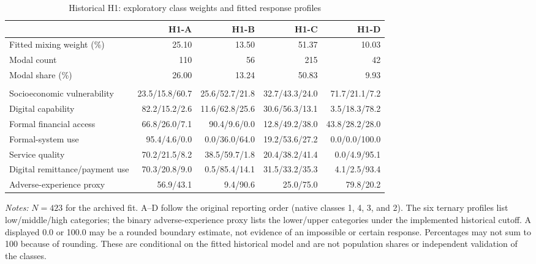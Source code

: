 \begin{table}[!htbp]
\centering
\caption{Historical H1: exploratory class weights and fitted response profiles}
\label{tab:historical-h1-profiles}
\small
\begin{tabular}{@{}lrrrr@{}}
\toprule
 & H1-A & H1-B & H1-C & H1-D \\
\midrule
Fitted mixing weight (\%) & 25.10 & 13.50 & 51.37 & 10.03 \\
Modal count & 110 & 56 & 215 & 42 \\
Modal share (\%) & 26.00 & 13.24 & 50.83 & 9.93 \\
\addlinespace
\multicolumn{5}{@{}l}{\textit{Fitted response probabilities (percent, by historical category)}} \\
Socioeconomic vulnerability & 23.5/15.8/60.7 & 25.6/52.7/21.8 & 32.7/43.3/24.0 & 71.7/21.1/7.2 \\
Digital capability & 82.2/15.2/2.6 & 11.6/62.8/25.6 & 30.6/56.3/13.1 & 3.5/18.3/78.2 \\
Formal financial access & 66.8/26.0/7.1 & 90.4/9.6/0.0 & 12.8/49.2/38.0 & 43.8/28.2/28.0 \\
Formal-system use & 95.4/4.6/0.0 & 0.0/36.0/64.0 & 19.2/53.6/27.2 & 0.0/0.0/100.0 \\
Service quality & 70.2/21.5/8.2 & 38.5/59.7/1.8 & 20.4/38.2/41.4 & 0.0/4.9/95.1 \\
Digital remittance/payment use & 70.3/20.8/9.0 & 0.5/85.4/14.1 & 31.5/33.2/35.3 & 4.1/2.5/93.4 \\
Adverse-experience proxy & 56.9/43.1 & 9.4/90.6 & 25.0/75.0 & 79.8/20.2 \\
\bottomrule
\end{tabular}
\par\smallskip
\begin{minipage}{0.98\linewidth}\footnotesize\raggedright
\textit{Notes:} $N=423$ for the archived fit. A--D follow the original reporting order (native classes 1, 4, 3, and 2). The six ternary profiles list low/middle/high categories; the binary adverse-experience proxy lists the lower/upper categories under the implemented historical cutoff. A displayed 0.0 or 100.0 may be a rounded boundary estimate, not evidence of an impossible or certain response. Percentages may not sum to 100 because of rounding. These are conditional on the fitted historical model and are not population shares or independent validation of the classes.
\end{minipage}
\end{table}

